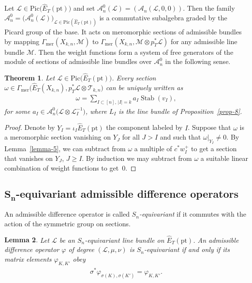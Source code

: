 \documentclass[10pt,a4paper]{amsart}
\numberwithin{equation}{section}
\newtheorem{Theorem}{Theorem}[section]
\newtheorem{Lemma}[Theorem]{Lemma}
\begin{document}
Let $\mathcal L\!\in\!\mathrm{Pic}\big(\hat E_T(\mathrm{pt})\big)$ and set $\mathcal A^0_n(\mathcal L)=(\mathcal A_n(\mathcal L,0,0))$. Then the family $\mathcal A_n^0=\big(\mathcal A^0_n(\mathcal L)\big)_{\mathcal L \in \mathrm{Pic}(\hat E_T(\mathrm{pt}))}$ is a commutative subalgebra graded by the Picard group of the base. It acts on meromorphic sections of admissible bundles by mapping $\Gamma_{\mathrm{mer}}(X_{k,n},\mathcal M)$ to $\Gamma_{\mathrm{mer}}(X_{k,n},\mathcal M\otimes p_T^*\mathcal L)$ for any admissible line bundle $\mathcal M$. Then the weight functions form a system of free generators of the module of sections of admissible line bundles over $\mathcal A^0_n$ in the following sense.
\begin{Theorem}\label{th-1} Let $\mathcal L\in\mathrm{Pic}\big(\hat E_T(\mathrm{pt})\big)$. Every section $\omega\in \Gamma_{\mathrm{mer}}\big(\hat E_T(X_{k,n}),p_T^*\mathcal L\otimes\mathcal T_{k,n}\big)$ can be uniquely written as
 \begin{gather*}
 \omega=\sum_{I\subset [n],\,|I|=k} a_I \operatorname{Stab}(v_I),
 \end{gather*}
 for some $a_I\in\mathcal A^0_n\big(\mathcal L\otimes\mathcal L_I^{-1}\big)$, where $L_I$ is the line bundle of Proposition~{\rm \ref{prop-8}}.
\end{Theorem}
\begin{proof} Denote by $Y_I=\iota_I\hat E_T(\mathrm{pt})$ the component labeled by $I$. Suppose that $\omega$ is a meromorphic section vanishing on $Y_J$ for all $J>I$ and such that $\omega|_{Y_I}\neq 0$. By Lemma~\ref{lemma-5}, we can subtract from $\omega$ a multiple of $c ^*w_I^+$ to get a section that vanishes on $Y_J$, $J\geq I$. By induction we may subtract from $\omega$ a suitable linear combination of weight functions to get~$0$.
\end{proof}

\subsection[$S_n$-equivariant admissible difference operators]{$\boldsymbol{S_n}$-equivariant admissible difference operators}
\begin{Definition} An admissible difference operator is called {\em $S_n$-equivariant} if it commutes with the action of the symmetric group on sections.
\end{Definition}

\begin{Lemma}\label{l-equiv} Let $\mathcal L$ be an $S_n$-equivariant line bundle on $\hat E_T(\mathrm{pt})$. An admissible difference operator $\varphi$ of degree $(\mathcal L,\mu,\nu)$ is $S_n$-equivariant if and only if its matrix elements $\varphi_{K,K'}$ obey
 \begin{gather*}
 \sigma^*\varphi_{\sigma(K),\sigma(K')}=\varphi_{K,K'}.
 \end{gather*}
\end{Lemma}
\end{document}
